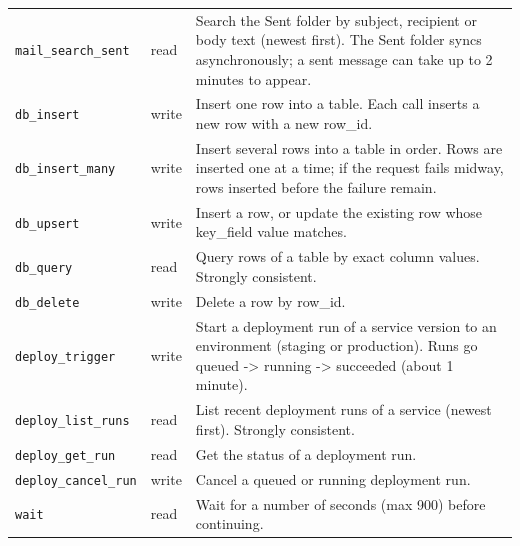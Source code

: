\begin{tabular}{llp{9.2cm}}
\texttt{mail\_search\_sent} & read & Search the Sent folder by subject, recipient or body text (newest first). The Sent folder syncs asynchronously; a sent message can take up to 2 minutes to appear. \\
\texttt{db\_insert} & write & Insert one row into a table. Each call inserts a new row with a new row\_id. \\
\texttt{db\_insert\_many} & write & Insert several rows into a table in order. Rows are inserted one at a time; if the request fails midway, rows inserted before the failure remain. \\
\texttt{db\_upsert} & write & Insert a row, or update the existing row whose key\_field value matches. \\
\texttt{db\_query} & read & Query rows of a table by exact column values. Strongly consistent. \\
\texttt{db\_delete} & write & Delete a row by row\_id. \\
\texttt{deploy\_trigger} & write & Start a deployment run of a service version to an environment (staging or production). Runs go queued -> running -> succeeded (about 1 minute). \\
\texttt{deploy\_list\_runs} & read & List recent deployment runs of a service (newest first). Strongly consistent. \\
\texttt{deploy\_get\_run} & read & Get the status of a deployment run. \\
\texttt{deploy\_cancel\_run} & write & Cancel a queued or running deployment run. \\
\texttt{wait} & read & Wait for a number of seconds (max 900) before continuing. \\
\bottomrule
\end{tabular}
